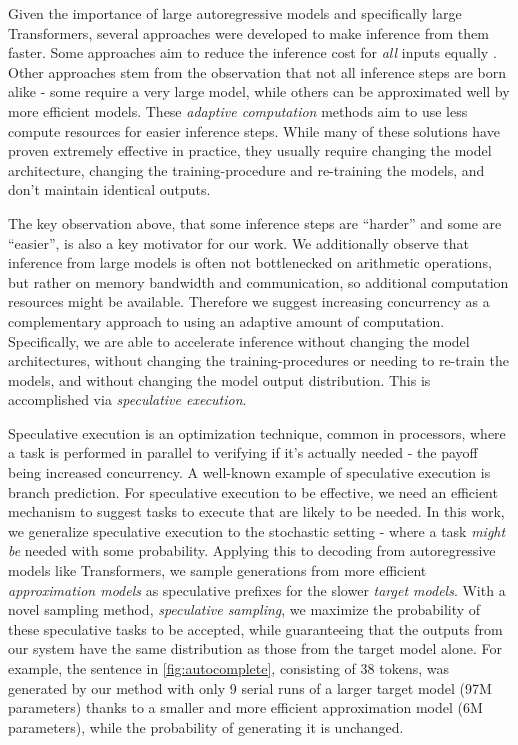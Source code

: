 \documentclass[nohyperref]{article}
\theoremstyle{plain}
\theoremstyle{definition}
\theoremstyle{remark}
\begin{document}
Given the importance of large autoregressive models and specifically large Transformers, several approaches were developed to make inference from them faster.
Some approaches aim to reduce the inference cost for \emph{all} inputs equally
\citep[e.g.][]{Distilling_the_Knowledge_in_a_Neural_Network, Sparse_is_Enough_in_Scaling_Transformers, Quantized_Neural_Networks, Primer, multi-query-attn}.
Other approaches stem from the observation that not all inference steps are born alike - some require a very large model, while others can be approximated well by more efficient models. These \emph{adaptive computation} methods
\citep[e.g.][]{Dynamic_Neural_Networks_Survey, Adaptive_Attention_Span_in_Transformers, Confident_Adaptive_Transformers, early_exits, Controlling_Computation_versus_Quality_Sequence_Models, depth_adaptive_transformer, Matching_Model_and_Instance_Complexities}
aim to use less compute resources for easier inference steps.
While many of these solutions have proven extremely effective in practice, they usually require changing the model architecture, changing the training-procedure and re-training the models, and don't maintain identical outputs.

The key observation above, that some inference steps are ``harder'' and some are ``easier'', is also a key motivator for our work.
We additionally observe that inference from large models is often not bottlenecked on arithmetic operations, but rather on memory bandwidth and communication, so additional computation resources might be available.
Therefore we suggest increasing concurrency as a complementary approach to using an adaptive amount of computation. Specifically, we are able to accelerate inference without changing the model architectures, without changing the training-procedures or needing to re-train the models, and without changing the model output distribution. This is accomplished via \emph{speculative execution}.

Speculative execution \cite{speculative_computation, HennessyPatterson12} is an optimization technique, common in processors, where a task is performed in parallel to verifying if it's actually needed - the payoff being increased concurrency. A well-known example of speculative execution is branch prediction.
For speculative execution to be effective, we need an efficient mechanism to suggest tasks to execute that are likely to be needed.
In this work, we generalize speculative execution to the stochastic setting - where a task \emph{might be} needed with some probability.
Applying this to decoding from autoregressive models like Transformers, we sample generations from more efficient \emph{approximation models} as speculative prefixes for the slower \emph{target models}.
With a novel sampling method, \emph{speculative sampling}, we maximize the probability of these speculative tasks to be accepted, while guaranteeing that the outputs from our system have the same distribution as those from the target model alone.
For example, the sentence in \cref{fig:autocomplete}, consisting of 38 tokens, was generated by our method with only 9 serial runs of a larger target model (97M parameters) thanks to a smaller and more efficient approximation model (6M parameters),
while the probability of generating it is unchanged.
\end{document}
